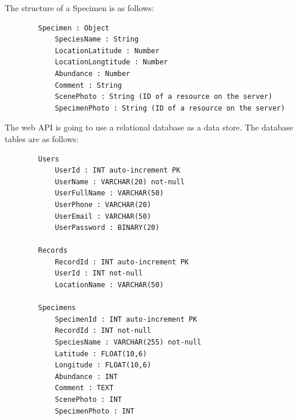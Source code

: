         The structure of a Specimen is as follows:
        \begin{verbatim}
        Specimen : Object
            SpeciesName : String
            LocationLatitude : Number
            LocationLongtitude : Number
            Abundance : Number
            Comment : String
            ScenePhoto : String (ID of a resource on the server)
            SpecimenPhoto : String (ID of a resource on the server)
        \end{verbatim}

        The web API is going to use a relational database as a data store.
        The database tables are as follows:

        \begin{verbatim}
        Users
            UserId : INT auto-increment PK
            UserName : VARCHAR(20) not-null
            UserFullName : VARCHAR(50)
            UserPhone : VARCHAR(20)
            UserEmail : VARCHAR(50)
            UserPassword : BINARY(20)
            
        Records
            RecordId : INT auto-increment PK
            UserId : INT not-null
            LocationName : VARCHAR(50)
            
        Specimens
            SpecimenId : INT auto-increment PK
            RecordId : INT not-null
            SpeciesName : VARCHAR(255) not-null
            Latitude : FLOAT(10,6)
            Longitude : FLOAT(10,6)
            Abundance : INT
            Comment : TEXT
            ScenePhoto : INT
            SpecimenPhoto : INT   
        \end{verbatim}